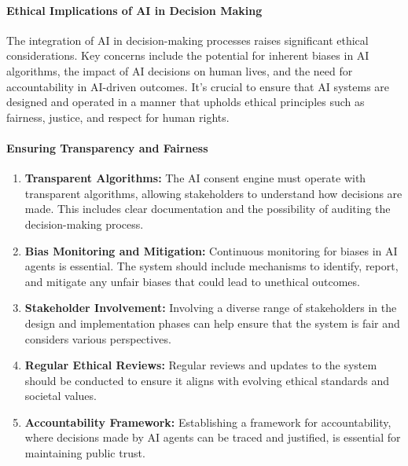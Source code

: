 \hypertarget{ethical-implications-of-ai-in-decision-making}{%
\paragraph{Ethical Implications of AI in Decision
Making}\label{ethical-implications-of-ai-in-decision-making}}

The integration of AI in decision-making processes raises significant
ethical considerations. Key concerns include the potential for inherent
biases in AI algorithms, the impact of AI decisions on human lives, and
the need for accountability in AI-driven outcomes. It's crucial to
ensure that AI systems are designed and operated in a manner that
upholds ethical principles such as fairness, justice, and respect for
human rights.

\hypertarget{ensuring-transparency-and-fairness}{%
\paragraph{Ensuring Transparency and
Fairness}\label{ensuring-transparency-and-fairness}}

\begin{enumerate}
\def\labelenumi{\arabic{enumi}.}
\item
  \textbf{Transparent Algorithms:} The AI consent engine must operate
  with transparent algorithms, allowing stakeholders to understand how
  decisions are made. This includes clear documentation and the
  possibility of auditing the decision-making process.
\item
  \textbf{Bias Monitoring and Mitigation:} Continuous monitoring for
  biases in AI agents is essential. The system should include mechanisms
  to identify, report, and mitigate any unfair biases that could lead to
  unethical outcomes.
\item
  \textbf{Stakeholder Involvement:} Involving a diverse range of
  stakeholders in the design and implementation phases can help ensure
  that the system is fair and considers various perspectives.
\item
  \textbf{Regular Ethical Reviews:} Regular reviews and updates to the
  system should be conducted to ensure it aligns with evolving ethical
  standards and societal values.
\item
  \textbf{Accountability Framework:} Establishing a framework for
  accountability, where decisions made by AI agents can be traced and
  justified, is essential for maintaining public trust.
\end{enumerate}

